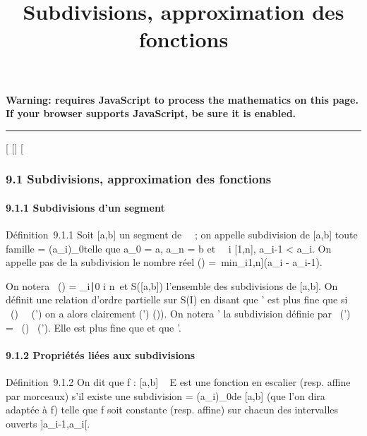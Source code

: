 \documentclass[]{article}
\title{Subdivisions, approximation des fonctions}
\author{}
\date{}
\begin{document}
\maketitle

\textbf{Warning: 
requires JavaScript to process the mathematics on this page.\\ If your
browser supports JavaScript, be sure it is enabled.}

\begin{center}\rule{3in}{0.4pt}\end{center}

{[}
{[}{]}
{[}

\subsubsection{9.1 Subdivisions, approximation des fonctions}

\paragraph{9.1.1 Subdivisions d'un segment}

Définition~9.1.1 Soit {[}a,b{]} un segment de ~~; on appelle subdivision
de {[}a,b{]} toute famille \sigma = (a\_i)\_0\leqi\leqn telle que
a\_0 = a, a\_n = b et \forall~~i \in
{[}1,n{]}, a\_i-1 \textless{} a\_i. On appelle pas de la
subdivision \sigma le nombre réel \delta(\sigma) =\
min\_i\in{[}1,n{]}(a\_i - a\_i-1).

On notera \mathrmPt~(\sigma) =
\a\_i∣0 \leq i \leq
n\ et S({[}a,b{]}) l'ensemble des subdivisions de
{[}a,b{]}. On définit une relation d'ordre partielle sur S(I) en disant
que \sigma' est plus fine que \sigma si
\mathrmPt~(\sigma)
\subset~\mathrmPt~(\sigma') on a alors
clairement \delta(\sigma') \leq \delta(\sigma)). On notera \sigma \cup \sigma' la subdivision définie par
\mathrmPt~(\sigma \cup \sigma')
= \mathrmPt~(\sigma)
\cup\mathrmPt~(\sigma'). Elle est
plus fine que \sigma et que \sigma'.

\paragraph{9.1.2 Propriétés liées aux subdivisions}

Définition~9.1.2 On dit que f : {[}a,b{]} \rightarrow~ E est une fonction en
escalier (resp. affine par morceaux) s'il existe une subdivision \sigma =
(a\_i)\_0\leqi\leqn de {[}a,b{]} (que l'on dira adaptée à f)
telle que f soit constante (resp. affine) sur chacun des intervalles
ouverts {]}a\_i-1,a\_i{[}.
\end{document}
